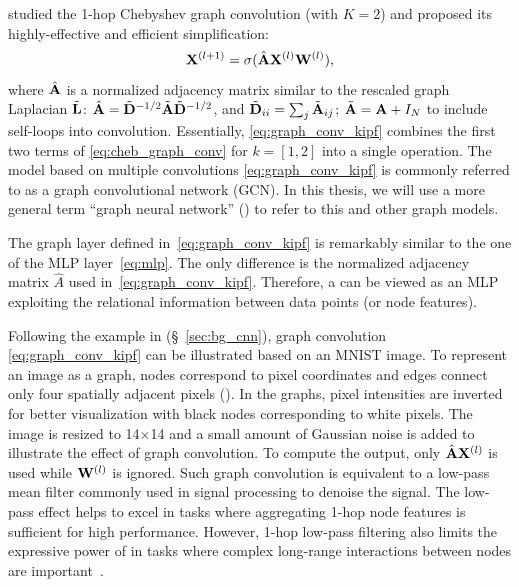 \citet{kipf2016semi} studied the 1-hop Chebyshev graph convolution (with $K=2$) and proposed its highly-effective and efficient simplification:
%
\begin{equation}
    \label{eq:graph_conv_kipf}
    \mathbf{X}^{(l+1)} = \sigma(\hat{\mathbf{A}}\mathbf{X}^{(l)}\mathbf{W}^{(l)}),
\end{equation}
%
\noindent where $\hat{\mathbf{A}}$ is a normalized adjacency matrix similar to the rescaled graph Laplacian $\tilde{\mathbf{L}}$: $\hat{\mathbf{A}} = \tilde{\mathbf{D}}^{-1/2}\tilde{\mathbf{A}}\tilde{\mathbf{D}}^{-1/2}$, and $\tilde{\mathbf{D}}_{ii} = \sum_j \tilde{\mathbf{A}}_{ij}$; $\tilde{\mathbf{A}} = \mathbf{A} + I_N$ to include self-loops into convolution. Essentially, \eqref{eq:graph_conv_kipf} combines the first two terms of \eqref{eq:cheb_graph_conv} for $k=[1,2]$ into a single operation. The model based on multiple convolutions \eqref{eq:graph_conv_kipf} is commonly referred to as a graph convolutional network (GCN). In this thesis, we will use a more general term ``graph neural network'' (\gnn) to refer to this and other graph models.

The graph layer defined in~\eqref{eq:graph_conv_kipf} is remarkably similar to the one of the MLP layer~\eqref{eq:mlp}. The only difference is the normalized adjacency matrix $\hat{A}$ used in~\eqref{eq:graph_conv_kipf}. Therefore, a \gnn can be viewed as an MLP exploiting the relational information between data points (or node features). 

Following the example in \fig{\ref{fig:conv}} (\S~\ref{sec:bg_cnn}), graph convolution \eqref{eq:graph_conv_kipf} can be illustrated based on an MNIST image. To represent an image as a graph, nodes correspond to pixel coordinates and edges connect only four spatially adjacent pixels (\fig{\ref{fig:graph_conv}}). In the graphs, pixel intensities are inverted for better visualization with black nodes corresponding to white pixels. The image is resized to 14$\times$14 and a small amount of Gaussian noise is added to illustrate the effect of graph convolution. To compute the output, only $\hat{\mathbf{A}}\mathbf{X}^{(l)}$ is used while $\mathbf{W}^{(l)}$ is ignored. Such graph convolution is equivalent to a low-pass mean filter commonly used in signal processing to denoise the signal. The low-pass effect helps \gnns to excel in tasks where aggregating 1-hop node features is sufficient for high performance. However, 1-hop low-pass filtering also limits the expressive power of \gnns in tasks where complex long-range interactions between nodes are important~\citep{nt2019revisiting,knyazev2019image}.~


